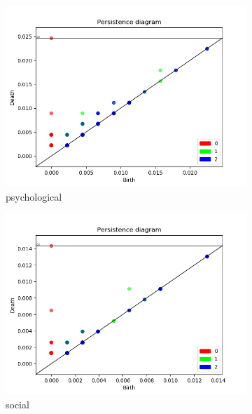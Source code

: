 \documentclass[fleqn]{article}
\begin{document}
\begin{figure}
\begin{subfigure}[t]{0.425\textwidth}
			\includegraphics[width=\textwidth]{figures/all_words/psychological.png}
			\caption{psychological}
			\label{fig:all:psychological}
		\end{subfigure}\hfill
		\begin{subfigure}[t]{0.425\textwidth}
			\includegraphics[width=\textwidth]{figures/all_words/social.png}
			\caption{social}
			\label{fig:all:social}
		\end{subfigure}\hfill
		\\
		\begin{subfigure}[t]{0.425\textwidth}

\end{subfigure}
\end{figure}
\end{document}

